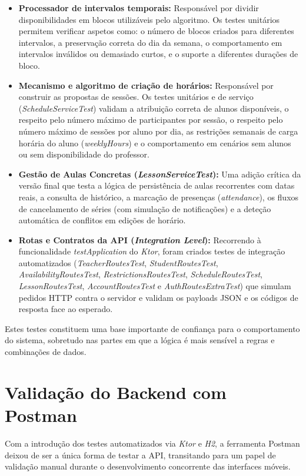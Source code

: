 \begin{itemize}
    \item \textbf{Processador de intervalos temporais:} Responsável por dividir disponibilidades em blocos utilizáveis pelo algoritmo. Os testes unitários permitem verificar aspetos como: o número de blocos criados para diferentes intervalos, a preservação correta do dia da semana, o comportamento em intervalos inválidos ou demasiado curtos, e o suporte a diferentes durações de bloco.
    \item \textbf{Mecanismo e algoritmo de criação de horários:} Responsável por construir as propostas de sessões. Os testes unitários e de serviço (\textit{ScheduleServiceTest}) validam a atribuição correta de alunos disponíveis, o respeito pelo número máximo de participantes por sessão, o respeito pelo número máximo de sessões por aluno por dia, as restrições semanais de carga horária do aluno (\textit{weeklyHours}) e o comportamento em cenários sem alunos ou sem disponibilidade do professor.
    \item \textbf{Gestão de Aulas Concretas (\textit{LessonServiceTest}):} Uma adição crítica da versão final que testa a lógica de persistência de aulas recorrentes com datas reais, a consulta de histórico, a marcação de presenças (\textit{attendance}), os fluxos de cancelamento de séries (com simulação de notificações) e a deteção automática de conflitos em edições de horário.
    \item \textbf{Rotas e Contratos da API (\textit{Integration Level}):} Recorrendo à funcionalidade \textit{testApplication} do \textit{Ktor}, foram criados testes de integração automatizados (\textit{TeacherRoutesTest}, \textit{StudentRoutesTest}, \textit{AvailabilityRoutesTest}, \textit{RestrictionsRoutesTest}, \textit{ScheduleRoutesTest}, \textit{LessonRoutesTest}, \textit{AccountRoutesTest} e \textit{AuthRoutesExtraTest}) que simulam pedidos HTTP contra o servidor e validam os payloads JSON e os códigos de resposta face ao esperado.
\end{itemize}

Estes testes constituem uma base importante de confiança para o comportamento do sistema, sobretudo nas partes em que a lógica é mais sensível a regras e combinações de dados.

\section{Validação do Backend com Postman}

Com a introdução dos testes automatizados via \textit{Ktor} e \textit{H2}, a ferramenta Postman deixou de ser a única forma de testar a API, transitando para um papel de validação manual durante o desenvolvimento concorrente das interfaces móveis.

